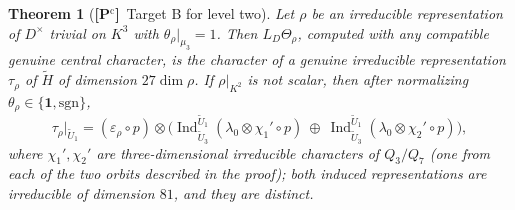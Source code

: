 \documentclass[11pt]{article}
\newcommand{\Ind}{\operatorname{Ind}}
\newcommand{\tH}{\widetilde H}
\newcommand{\tU}{\widetilde U}
\newcommand{\Pctag}{\textnormal{\textbf{[P$^{\mathrm c}$]}}}
\theoremstyle{plain}
\newtheorem{theorem}{Theorem}[section]
\theoremstyle{definition}
\begin{document}
\begin{theorem}[\Pctag\ Target B for level two]\label{thm:leveltwo}
Let $\rho$ be an irreducible representation of $D^\times$ trivial on
$K^3$ with $\theta_\rho|_{\mu_3}=1$.  Then $L_D\Theta_\rho$, computed
with any compatible genuine central character, is the character of a
genuine irreducible representation $\tau_\rho$ of $\tH$ of dimension
$27\dim\rho$.  If $\rho|_{K^2}$ is not scalar, then after normalizing
$\theta_\rho\in\{\mathbf1,\mathrm{sgn}\}$,
\[
 \tau_\rho|_{\tU_1}=(\varepsilon_\rho\circ p)\otimes\bigl(\Ind_{\tU_3}^{\tU_1}(\lambda_0\otimes\chi_1'\circ p)\ \oplus\ \Ind_{\tU_3}^{\tU_1}(\lambda_0\otimes\chi_2'\circ p)\bigr),
\]
where $\chi_1',\chi_2'$ are three-dimensional irreducible characters of
$Q_3/Q_7$ (one from each of the two orbits described in the proof); both
induced representations are irreducible of dimension $81$, and they are
distinct.
\end{theorem}
\end{document}
